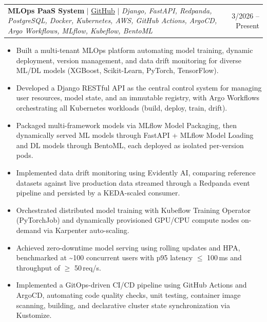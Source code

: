 \documentclass[letterpaper,11pt]{article}
\makeatletter
\newcommand{\resumeItem}[1]{
  \item\small{{#1 \vspace{-2pt}}}
}
\newcommand{\resumeProjectHeading}[2]{
    \item
    \begin{tabular*}{0.97\textwidth}{p{0.78\textwidth}@{\extracolsep{\fill}}r}
      \small#1 & #2 \\
    \end{tabular*}\vspace{-7pt}
}
\newcommand{\resumeItemListStart}{\begin{itemize}[leftmargin=0.18in]}
\newcommand{\resumeItemListEnd}{\end{itemize}\vspace{-5pt}}
\makeatother
\begin{document}
\resumeProjectHeading
{\textbf{MLOps PaaS System} $|$ \href{https://github.com/Viet-Hoang-2005/mlops-paas-system}{GitHub} $|$ \emph{Django, FastAPI, Redpanda, PostgreSQL, Docker, Kubernetes, AWS, GitHub Actions, ArgoCD, Argo Workflows, MLflow, Kubeflow, BentoML}}
{3/2026 -- Present}
\resumeItemListStart
\resumeItem{Built a multi-tenant MLOps platform automating model training, dynamic deployment, version management, and data drift monitoring for diverse ML/DL models (XGBoost, Scikit-Learn, PyTorch, TensorFlow).}
\resumeItem{Developed a Django RESTful API as the central control system for managing user resources, model state, and an immutable registry, with Argo Workflows orchestrating all Kubernetes workloads (build, deploy, train, drift).}
\resumeItem{Packaged multi-framework models via MLflow Model Packaging, then dynamically served ML models through FastAPI + MLflow Model Loading and DL models through BentoML, each deployed as isolated per-version pods.}
\resumeItem{Implemented data drift monitoring using Evidently AI, comparing reference datasets against live production data streamed through a Redpanda event pipeline and persisted by a KEDA-scaled consumer.}
\resumeItem{Orchestrated distributed model training with Kubeflow Training Operator (PyTorchJob) and dynamically provisioned GPU/CPU compute nodes on-demand via Karpenter auto-scaling.}
\resumeItem{Achieved zero-downtime model serving using rolling updates and HPA, benchmarked at \textasciitilde100 concurrent users with p95 latency $\leq$ 100\,ms and throughput of $\geq$ 50\,req/s.}
\resumeItem{Implemented a GitOps-driven CI/CD pipeline using GitHub Actions and ArgoCD, automating code quality checks, unit testing, container image scanning, building, and declarative cluster state synchronization via Kustomize.}
\resumeItemListEnd
\end{document}
